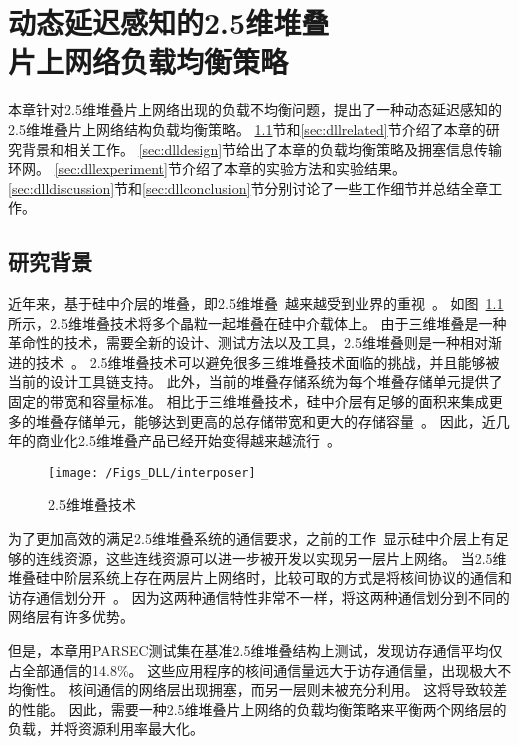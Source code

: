 \chapter{动态延迟感知的2.5维堆叠\\片上网络负载均衡策略}
\label{chap:DLL}
本章针对2.5维堆叠片上网络出现的负载不均衡问题，提出了一种动态延迟感知的2.5维堆叠片上网络结构负载均衡策略。
\ref{sec:dllbackground}节和\ref{sec:dllrelated}节介绍了本章的研究背景和相关工作。
\ref{sec:dlldesign}节给出了本章的负载均衡策略及拥塞信息传输环网。
\ref{sec:dllexperiment}节介绍了本章的实验方法和实验结果。
\ref{sec:dlldiscussion}节和\ref{sec:dllconclusion}节分别讨论了一些工作细节并总结全章工作。

\section{研究背景}
\label{sec:dllbackground}

近年来，基于硅中介层的堆叠，即2.5维堆叠~越来越受到业界的重视~。
如图~\ref{fig:interposer}所示，2.5维堆叠技术将多个晶粒一起堆叠在硅中介载体上。
由于三维堆叠是一种革命性的技术，需要全新的设计、测试方法以及工具，2.5维堆叠则是一种相对渐进的技术~。
2.5维堆叠技术可以避免很多三维堆叠技术面临的挑战，并且能够被当前的设计工具链支持。
此外，当前的堆叠存储系统为每个堆叠存储单元提供了固定的带宽和容量标准。
相比于三维堆叠技术，硅中介层有足够的面积来集成更多的堆叠存储单元，能够达到更高的总存储带宽和更大的存储容量~。
因此，近几年的商业化2.5维堆叠产品已经开始变得越来越流行~。

\begin{figure}[htbp] %
  \centering
  \texttt{[image: /Figs\_DLL/interposer]}
  \caption{2.5维堆叠技术}
  \label{fig:interposer}
\end{figure}

为了更加高效的满足2.5维堆叠系统的通信要求，之前的工作~显示硅中介层上有足够的连线资源，这些连线资源可以进一步被开发以实现另一层片上网络。
当2.5维堆叠硅中阶层系统上存在两层片上网络时，比较可取的方式是将核间协议的通信和访存通信划分开~。
因为这两种通信特性非常不一样，将这两种通信划分到不同的网络层有许多优势。

但是，本章用PARSEC测试集在基准2.5维堆叠结构上测试，发现访存通信平均仅占全部通信的14.8\%。
这些应用程序的核间通信量远大于访存通信量，出现极大不均衡性。
核间通信的网络层出现拥塞，而另一层则未被充分利用。
这将导致较差的性能。
因此，需要一种2.5维堆叠片上网络的负载均衡策略来平衡两个网络层的负载，并将资源利用率最大化。


